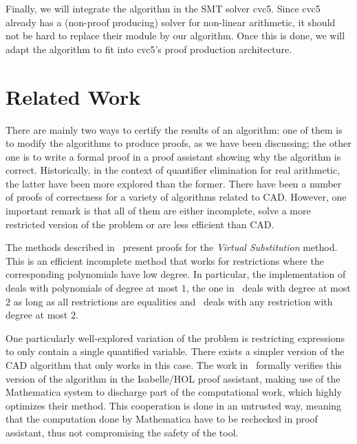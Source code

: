\documentclass[a4paper, 12pt]{article}
\newcommand{\yell}[1]{{\color{blue} [#1]}}
\newcommand{\tom}[1]{\yell{#1 --tom}}
\begin{document}
Finally, we will integrate the algorithm in the SMT solver cvc5. Since cvc5 already has a (non-proof producing) solver for
non-linear arithmetic, it should not be hard to replace their module by our algorithm. Once this is done, we will adapt the
algorithm to fit into cvc5's proof production architecture.


\section{Related Work}

There are mainly two ways to certify the results of an algorithm: one of them is to modify the
algorithms to produce proofs, as we have been discussing; the other one is to write a formal proof in a proof assistant
showing why the algorithm is correct. Historically, in the context of quantifier elimination for real arithmetic, the latter have
been more explored than the former. There have been a number of proofs of correctness for a variety of algorithms related to CAD.
However, one important remark is that all of them are either incomplete, solve a more restricted version of the problem
or are less efficient than CAD.

The methods described in~\cite{kosaian2,nipkowVS,chaiebVS} present proofs for the \textit{Virtual Substitution} method.
This is an efficient incomplete method that works for restrictions where the corresponding polynomials have low degree.
In particular, the implementation of~\cite{nipkowVS} deals with polynomials of degree at most $1$, the one
in~\cite{chaiebVS} deals with degree at most $2$ as long as all restrictions are equalities and~\cite{kosaian2}
deals with any restriction with degree at most $2$.

One particularly well-explored variation of the problem is restricting expressions to only contain a single quantified variable.
There exists a simpler version of the CAD algorithm that only works in this case. The work in~\cite{univCad} formally verifies
this version of the algorithm in the Isabelle/HOL proof assistant, making use of the Mathematica system to discharge
part of the computational work, which highly optimizes their method. This cooperation is done in an untrusted way, meaning
that the computation done by Mathematica have to be rechecked in proof assistant, thus not compromising the safety of the tool.
\end{document}
